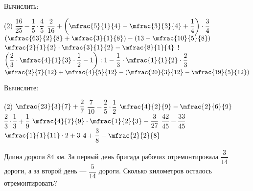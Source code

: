 \begin{class}[number=6]
	\begin{listofex}
			\item  Вычислить:
		\begin{tasks}(2)
			\task \( \dfrac{16}{25}-\dfrac{1}{5}\cdot\dfrac{4}{5} \)
			\task  \(\dfrac{2}{16}+\left( \mfrac{5}{1}{4}-\mfrac{3}{3}{4}+\dfrac{1}{4} \right)\cdot\dfrac{3}{4}\)
			\task \( \left( \mfrac{63}{2}{8}+\mfrac{3}{1}{8} \right)-\left( 13-\mfrac{10}{5}{8} \right) \)
			\task \( \mfrac{2}{1}{2}\cdot\mfrac{3}{1}{2}-\mfrac{8}{1}{4} \)
			\task!\( \left( \dfrac{2}{3}\cdot\mfrac{4}{1}{3}\cdot\dfrac{1}{2}-1 \right):1-\dfrac{1}{3}\cdot\mfrac{1}{1}{2}\cdot\dfrac{2}{3} \)
			\task \( \mfrac{2}{7}{12}+\mfrac{4}{5}{12}-\left( \mfrac{20}{3}{12}-\mfrac{19}{5}{12} \right) \)
		\end{tasks}
		
	\end{listofex}
\end{class}

\begin{homework}[number=3]
	\begin{listofex}
		\item Вычислите:
		\begin{tasks}(2)
			\task \( \mfrac{23}{3}{7}+\dfrac{2}{7} \)
			\task \( \dfrac{7}{10} - \dfrac{2}{5}\cdot\dfrac{1}{2}\)
			\task \( \mfrac{4}{2}{9}-\mfrac{2}{6}{9} \)
			\task \( \dfrac{2}{3}\cdot\dfrac{1}{3}+\dfrac{1}{9} \)
			\task \( \mfrac{4}{7}{9}\cdot\mfrac{1}{2}{3}-\dfrac{3}{27} \)
			\task \( \dfrac{42}{45}-\dfrac{33}{45} \)
			\task \( \mfrac{1}{1}{11}\cdot2+3\)
			\task \( 4+\dfrac{3}{8}-\mfrac{2}{2}{8} \)
		\end{tasks}
		\item Длина дороги \( 84 \) км. За первый день бригада рабочих отремонтировала \(\dfrac{ 3}{14} \) дороги, а за второй день --- \( \dfrac{5}{14} \) дороги. Сколько километров осталось отремонтировать? 
	\end{listofex}
\end{homework}

